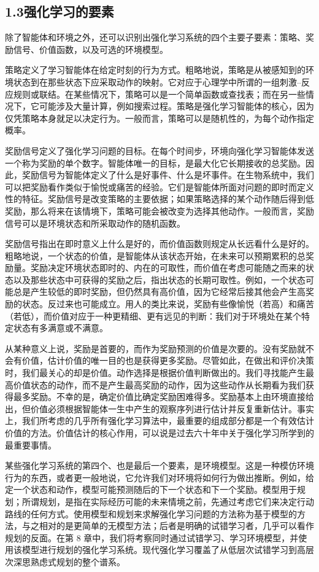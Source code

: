 \documentclass[UTF8,12pt,a4paper,fontset=fandol]{ctexart}
\begin{document}
\subsection*{1.3\quad 强化学习的要素}

除了智能体和环境之外，还可以识别出强化学习系统的四个主要子要素：策略、奖励信号、价值函数，以及可选的环境模型。

策略定义了学习智能体在给定时刻的行为方式。粗略地说，策略是从被感知到的环境状态到在那些状态下应采取动作的映射。它对应于心理学中所谓的一组刺激--反应规则或联结。在某些情况下，策略可以是一个简单函数或查找表；而在另一些情况下，它可能涉及大量计算，例如搜索过程。策略是强化学习智能体的核心，因为仅凭策略本身就足以决定行为。一般而言，策略可以是随机性的，为每个动作指定概率。

奖励信号定义了强化学习问题的目标。在每个时间步，环境向强化学习智能体发送一个称为奖励的单个数字。智能体唯一的目标，是最大化它长期接收的总奖励。因此，奖励信号为智能体定义了什么是好事件、什么是坏事件。在生物系统中，我们可以把奖励看作类似于愉悦或痛苦的经验。它们是智能体所面对问题的即时而定义性的特征。奖励信号是改变策略的主要依据；如果策略选择的某个动作随后得到低奖励，那么将来在该情境下，策略可能会被改变为选择其他动作。一般而言，奖励信号可以是环境状态和所采取动作的随机函数。

奖励信号指出在即时意义上什么是好的，而价值函数则规定从长远看什么是好的。粗略地说，一个状态的价值，是智能体从该状态开始，在未来可以预期累积的总奖励量。奖励决定环境状态即时的、内在的可取性，而价值在考虑可能随之而来的状态以及那些状态中可获得的奖励之后，指出状态的长期可取性。例如，一个状态可能总是产生较低的即时奖励，但仍然具有高价值，因为它经常后接其他会产生高奖励的状态。反过来也可能成立。用人的类比来说，奖励有些像愉悦（若高）和痛苦（若低），而价值对应于一种更精细、更有远见的判断：我们对于环境处在某个特定状态有多满意或不满意。

从某种意义上说，奖励是首要的，而作为奖励预测的价值是次要的。没有奖励就不会有价值，估计价值的唯一目的也是获得更多奖励。尽管如此，在做出和评价决策时，我们最关心的却是价值。动作选择是根据价值判断做出的。我们寻找能产生最高价值状态的动作，而不是产生最高奖励的动作，因为这些动作从长期看为我们获得最多奖励。不幸的是，确定价值比确定奖励困难得多。奖励基本上由环境直接给出，但价值必须根据智能体一生中产生的观察序列进行估计并反复重新估计。事实上，我们所考虑的几乎所有强化学习算法中，最重要的组成部分都是一个有效估计价值的方法。价值估计的核心作用，可以说是过去六十年中关于强化学习所学到的最重要事情。

某些强化学习系统的第四个、也是最后一个要素，是环境模型。这是一种模仿环境行为的东西，或者更一般地说，它允许我们对环境将如何行为做出推断。例如，给定一个状态和动作，模型可能预测随后的下一个状态和下一个奖励。模型用于规划；所谓规划，是指在实际经历可能的未来情境之前，先通过考虑它们来决定行动路线的任何方式。使用模型和规划来求解强化学习问题的方法称为基于模型的方法，与之相对的是更简单的无模型方法；后者是明确的试错学习者，几乎可以看作规划的反面。在第 8 章中，我们将考察同时通过试错学习、学习环境模型，并使用该模型进行规划的强化学习系统。现代强化学习覆盖了从低层次试错学习到高层次深思熟虑式规划的整个谱系。
\end{document}
